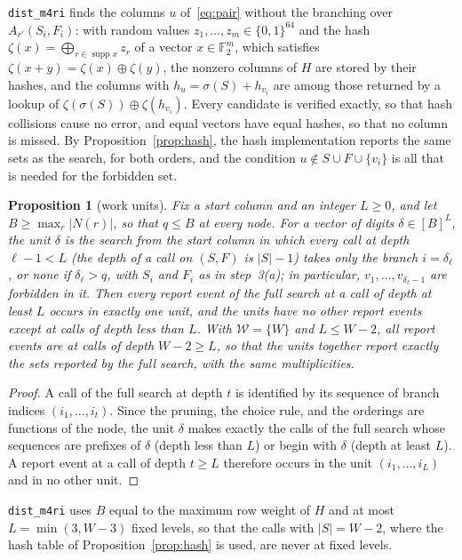 \documentclass[11pt]{article}
\newtheorem{proposition}[theorem]{Proposition}
\theoremstyle{definition}
\newcommand{\Ftwo}{\mathbb{F}_2}
\DeclareMathOperator{\supp}{supp}
\newcommand{\Wr}{\mathcal{W}}   %
\newcommand{\ttt}[1]{\texttt{#1}}
\begin{document}
\ttt{dist\_m4ri} finds the columns $u$ of~\eqref{eq:pair} without the branching over $A_{r'}(S_i,F_i)$: with random
values $z_1,\dots,z_m\in\{0,1\}^{64}$ and the hash $\zeta(x)=\bigoplus_{r\in\supp x}z_r$ of a vector $x\in\Ftwo^m$,
which satisfies $\zeta(x+y)=\zeta(x)\oplus\zeta(y)$, the nonzero columns of $H$ are stored by their hashes, and the
columns with $h_u=\sigma(S)+h_{v_i}$ are among those returned by a lookup of $\zeta(\sigma(S))\oplus\zeta(h_{v_i})$.
Every candidate is verified exactly, so that hash collisions cause no error, and equal vectors have equal hashes, so
that no column is missed. By Proposition~\ref{prop:hash}, the hash implementation reports the same sets as the search,
for both orders, and the condition $u\notin S\cup F\cup\{v_i\}$ is all that is needed for the forbidden set.

\begin{proposition}[work units]\label{prop:units}
Fix a start column and an integer $L\ge0$, and let $B\ge\max_r|N(r)|$, so that $q\le B$ at every node. For a vector of
digits $\delta\in[B]^L$, the \emph{unit} $\delta$ is the search from the start column in which every call at depth
$\ell-1<L$ (the depth of a call on $(S,F)$ is $|S|-1$) takes only the branch $i=\delta_\ell$, or none if
$\delta_\ell>q$, with $S_i$ and $F_i$ as in step~3(a); in particular, $v_1,\dots,v_{\delta_\ell-1}$ are forbidden in
it. Then every report event of the full search at a call of depth at least $L$ occurs in exactly one unit, and the
units have no other report events except at calls of depth less than $L$. With $\Wr=\{W\}$ and $L\le W-2$, all report
events are at calls of depth $W-2\ge L$, so that the units together report exactly the sets reported by the full
search, with the same multiplicities.
\end{proposition}

\begin{proof}
A call of the full search at depth $t$ is identified by its sequence of branch indices $(i_1,\dots,i_t)$. Since the
pruning, the choice rule, and the orderings are functions of the node, the unit $\delta$ makes exactly the calls of the
full search whose sequences are prefixes of $\delta$ (depth less than $L$) or begin with $\delta$ (depth at least $L$).
A report event at a call of depth $t\ge L$ therefore occurs in the unit $(i_1,\dots,i_L)$ and in no other unit.
\end{proof}

\ttt{dist\_m4ri} uses $B$ equal to the maximum row weight of $H$ and at most $L=\min(3,W-3)$ fixed levels, so that
the calls with $|S|=W-2$, where the hash table of Proposition~\ref{prop:hash} is used, are never at fixed levels.
\end{document}

